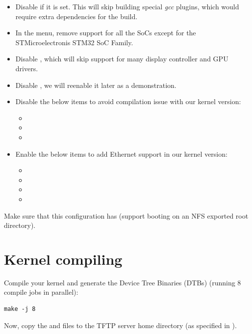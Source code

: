\begin{itemize}
\item Disable  if it is set. This will skip
  building special {\em gcc} plugins, which would require extra dependencies
  for the build.
\item In the  menu, remove support for all the SoCs except
for the STMicroelectronis STM32 SoC Family.
\item Disable , which will skip support for many display
controller and GPU drivers.
\item Disable , we will reenable it later as a demonstration.
\item Disable the below items to avoid compilation issue with our kernel version:
\begin{itemize}
\item {}
\item {}
\item {}
\end{itemize}
\item Enable the below items to add Ethernet support in our kernel version:
\begin{itemize}
\item {}
\item {}
\item {}
\item {}
\end{itemize}
\end{itemize}

Make sure that this configuration has  (support
booting on an NFS exported root directory).

\section{Kernel compiling}

Compile your kernel and generate the Device Tree Binaries (DTBs)
(running 8 compile jobs in parallel):

\begin{verbatim}
make -j 8
\end{verbatim}

Now, copy the  and  files to the
TFTP server home directory (as specified in ).

